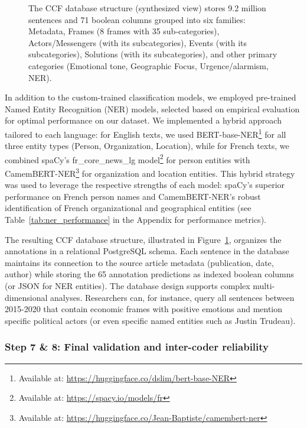 \documentclass[12pt]{article}
\begin{document}
\begin{figure}[b!]
{\begin{tikzpicture}
\end{tikzpicture}
}
\caption{The CCF database structure (synthesized view) stores 9.2 million sentences and 71 boolean columns grouped into six families: Metadata, Frames (8 frames with 35 sub-categories), Actors/Messengers (with its subcategories), Events (with its subcategories), Solutions (with its subcategories), and other primary categories (Emotional tone, Geographic Focus, Urgence/alarmism, NER).}
\label{fig:database_structure}
\end{figure}

In addition to the custom-trained classification models, we employed pre-trained Named Entity Recognition (NER) models, selected based on empirical evaluation for optimal performance on our dataset. We implemented a hybrid approach tailored to each language: for English texts, we used BERT-base-NER\footnote{Available at: \url{https://huggingface.co/dslim/bert-base-NER}} for all three entity types (Person, Organization, Location), while for French texts, we combined spaCy's fr\_core\_news\_lg model\footnote{Available at: \url{https://spacy.io/models/fr}} for person entities with CamemBERT-NER\footnote{Available at: \url{https://huggingface.co/Jean-Baptiste/camembert-ner}} for organization and location entities. This hybrid strategy was used to leverage the respective strengths of each model: spaCy's superior performance on French person names and CamemBERT-NER's robust identification of French organizational and geographical entities (see Table~\ref{tab:ner_performance} in the Appendix for performance metrics).

The resulting CCF database structure, illustrated in Figure~\ref{fig:database_structure}, organizes the annotations in a relational PostgreSQL schema. Each sentence in the database maintains its connection to the source article metadata (publication, date, author) while storing the 65 annotation predictions as indexed boolean columns (or JSON for NER entities). The database design supports complex multi-dimensional analyses. Researchers can, for instance, query all sentences between 2015-2020 that contain economic frames with positive emotions and mention specific political actors (or even specific named entities such as Justin Trudeau).

\subsubsection{Step 7 \& 8: Final validation and inter-coder reliability}
\end{document}
